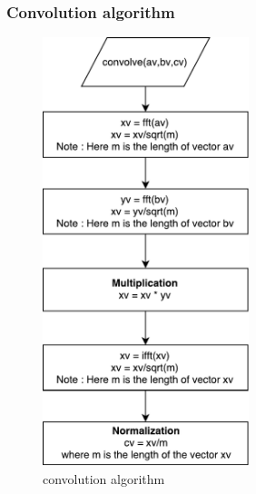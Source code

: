 \subsubsection{Convolution algorithm}
\begin{figure}[h]
	\centering
	\includegraphics[width=6cm]{./algorithms/fft/figures/convolution.pdf}
	\caption{convolution algorithm}\label{convolution}
\end{figure}





\newpage
